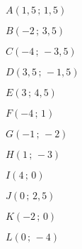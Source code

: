    \begin{colitemize}{2}
      \item \blue $A(1,5\,;\,1,5)$
      \item \blue $B(-2\,;\,3,5)$
      \item \blue $C(-4\,;\,-3,5)$
      \item \blue $D(3,5\,;\,-1,5)$
      \item \blue $E(3\,;\,4,5)$
      \item \blue $F(-4\,;\,1)$
      \item \blue $G(-1\,;\,-2)$
      \item \blue $H(1\,;\,-3)$
      \item \blue $I(4\,;\,0)$
      \item \blue $J(0\,;\,2,5)$
      \item \blue $K(-2\,;\,0)$
      \item \blue $L(0\,;\,-4)$
   \end{colitemize}
